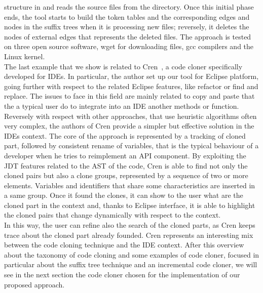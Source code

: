 structure in and reads the source files from the directory. Once this initial 
phase ends, the tool starts to build the token tables and the corresponding 
edges and nodes in the suffix trees when it is processing new files; reversely, 
it deletes the nodes of external edges that represents the deleted files. The 
approach is tested on three open source software, wget for downloading files, 
gcc compilers and the Linux kernel. \\
The last example that we show is related to Cren~\cite{jablonski_cren:_2007}, a 
code cloner specifically developed for IDEs. In particular, the author set up 
our tool for Eclipse platform, going further with respect to the related 
Eclipse features, like refactor or  find and replace. The issues to face in 
this field are mainly related to copy and paste that the a typical user do to 
integrate into an IDE another methods or function. Reversely with respect with 
other approaches, that use heuristic algorithms often very complex, the authors 
of Cren provide a simpler but  effective solution in the IDEs context. 
The core of the approach is represented by a tracking of cloned part, followed 
by consistent rename of variables, that is the typical behaviour of a developer 
when he tries to reimplement an API component. By exploiting the JDT features 
related to the AST of the code, Cren is able to find not only the cloned pairs 
but also a clone groups, represented by a sequence of two or more elements. 
Variables and identifiers that share some characteristics are inserted in a 
same group. Once it found the clones, it can show to the user what are the 
cloned part in the context and, thanks to Eclipse interface, it is able to 
highlight the cloned pairs that change dynamically with respect to the context. 
\\
In this way, the user can refine also the search of the cloned parts, as Cren 
keeps trace about the cloned part already founded. Cren represents an 
interesting mix between the code cloning technique and the IDE context. After 
this overview about the taxonomy of code cloning and some examples of code 
cloner, focused in particular about the suffix tree technique and an 
incremental code cloner, we will see in the next section the code cloner chosen 
for the implementation of our proposed approach. 
\newpage
